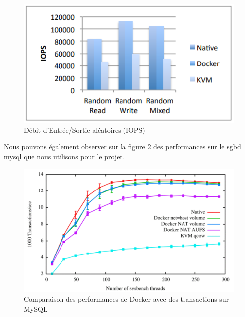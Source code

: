 \documentclass[
    iai, %
    il, %
]{heig-tb}
\begin{document}
\begin{center}
    \begin{figure}
        \includegraphics[width=\textwidth]{./assets/figures/docker-perf-random-io.png}
        \caption[Débit d'I/O aléatoires]{Débit d'Entrée/Sortie aléatoires (IOPS) \cite{rad2017introduction} \label{random-io}}
    \end{figure}
\end{center}

Nous pouvons également observer sur la figure \ref{docker-perf-mysql} des performances sur le \Gls{sgbd} \Gls{mysql}
que nous utilisons pour le projet.

\begin{center}
    \begin{figure}
        \includegraphics[width=\textwidth]{./assets/figures/docker-perf-mysql.png}
        \caption[Comparaison des perf. Docker sur MySQ]{Comparaison des performances de Docker avec des transactions sur MySQL \cite{felter} \label{docker-perf-mysql}}
    \end{figure}
\end{center}
\end{document}
